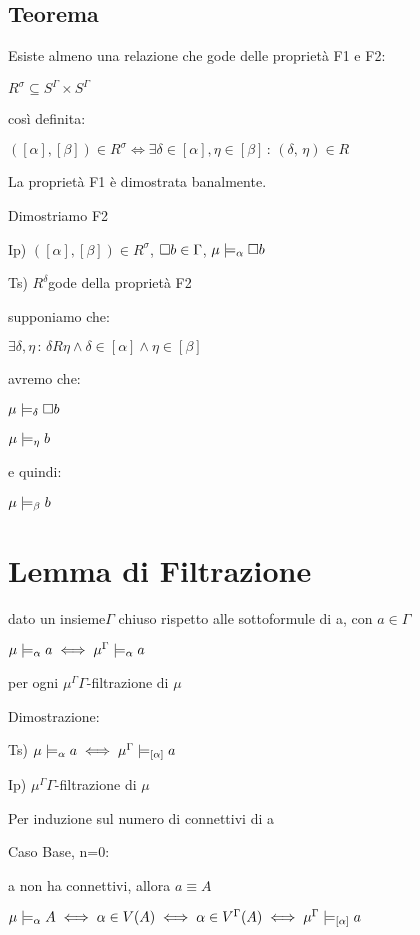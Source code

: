 \subsection{Teorema}

Esiste almeno una relazione che gode delle proprietà F1 e F2:

$R^{\sigma}\subseteq S^{\Gamma}\times S^{\Gamma}$

così definita:

$([\alpha],[\beta])\in R^{\sigma}\iff\exists\delta\in[\alpha],\eta\in[\beta]\,:\,(\delta,\,\eta)\in R$

La proprietà F1 è dimostrata banalmente.

Dimostriamo F2

Ip) $([\alpha],[\beta])\in R^{\sigma}$, $\square b\in\Gamma$, $\mu\models_{\alpha}\square b$

Ts) $R^{\delta}$gode della proprietà F2

supponiamo che:

$\exists\delta,\eta\,:\,\delta R\eta\wedge\delta\in[\alpha]\wedge\eta\in[\beta]$

avremo che:

$\mu\models_{\delta}\square b$

$\mu\models_{\eta}b$

e quindi:

$\mu\models_{\beta}b$\\



\section{Lemma di Filtrazione}

dato un insieme$\Gamma$ chiuso rispetto alle sottoformule di a, con
$a\in\Gamma$

$\mu\models_{\alpha}a\iff\mu^{\Gamma}\models_{\alpha}a$

per ogni $\mu^{\Gamma}$$\Gamma$-filtrazione di $\mu$

Dimostrazione:

Ts) $\mu\models_{\alpha}a\iff\mu^{\Gamma}\models_{[\alpha]}a$

Ip) $\mu^{\Gamma}$$\Gamma$-filtrazione di $\mu$

Per induzione sul numero di connettivi di a

Caso Base, n=0:

a non ha connettivi, allora $a\equiv A$

$\mu\models_{\alpha}A\iff\alpha\in V(A)\iff\alpha\in V^{\Gamma}(A)\iff\mu^{\Gamma}\models_{[\alpha]}a$

